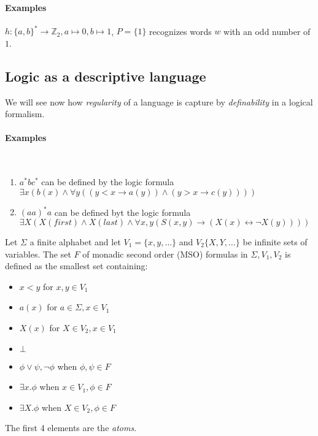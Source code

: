 \paragraph{Examples}
$h:\{a,b\}^{*}\to\mathbb{Z}_{2}, a\mapsto 0, b\mapsto 1$, $P = \{1\}$ 
recognizes words $w$ with an odd number of $1$.


\subsection{Logic as a descriptive language} %
\label{sub:logic_as_a_descriptive_language}

We will see now how \emph{regularity} of a language is capture by 
\emph{definability} in a logical formalism.

\paragraph{Examples}~
\begin{enumerate}
	\item $a^*bc^*$ can be defined by the logic formula
	$\exists x (b(x) \land\forall y((y<x \to a(y)) \land(y>x \to c(y))))$
	\item $(aa)^*a$ can be defined byt the logic formula
		$\exists X (X(first)\land X(last)\land\forall x,y (S(x,y)\to(X(x)
		\leftrightarrow \neg X(y))))$
\end{enumerate}

\begin{definition}[Syntax]
	Let $\Sigma$ a finite alphabet and let
	$V_{1} = \{x, y,\ldots\}$ and $V_{2}\{X, Y, \ldots\}$ be
	infinite sets of variables.
	The set $F$ of monadic second order (MSO) formulas in $\Sigma, V_{1}, V_{2}$ 
	is defined as the smallest set containing:
	\begin{itemize}
		\item $x < y$ for $x, y \in V_{1}$ 
		\item $a(x)$ for $a\in \Sigma, x\in V_{1}$
		\item $X(x)$ for $X \in V_{2}, x \in V_{1}$ 
		\item $\bot$ 
		\item $\phi \lor \psi, \neg \phi$ when $\phi, \psi \in F$ 
		\item $\exists x. \phi$ when $x \in V_{1}, \phi \in F$ 
		\item $\exists X. \phi$ when $X \in V_{2}, \phi \in F$ 
	\end{itemize}
	The first 4 elements are the \emph{atoms}.
\end{definition}

